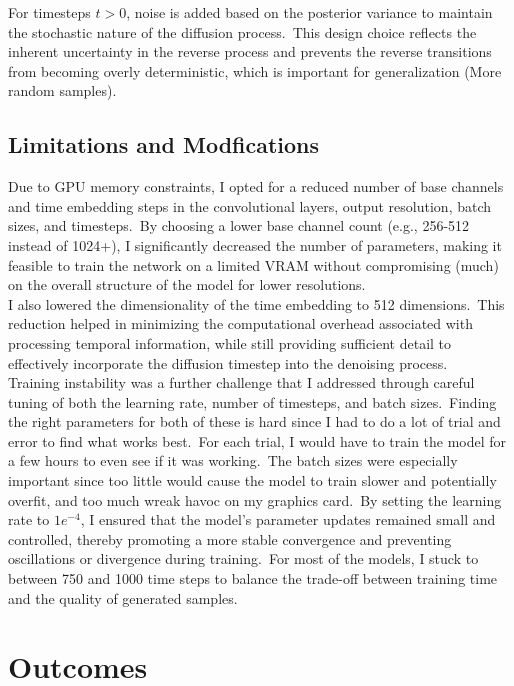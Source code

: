 \documentclass[12pt]{article}
\begin{document}
For timesteps $t > 0$, noise is added based on the posterior variance to maintain the stochastic nature of the diffusion process.\
This design choice reflects the inherent uncertainty in the reverse process and prevents the reverse transitions from becoming overly deterministic, which is important for generalization (More random samples).

\subsection{Limitations and Modfications}
Due to GPU memory constraints, I opted for a reduced number of base channels and time embedding steps in the convolutional layers, output resolution, batch sizes, and timesteps.\
By choosing a lower base channel count (e.g., 256-512 instead of 1024+), I significantly decreased the number of parameters, making it feasible to train the network on a limited VRAM without compromising (much) on the overall structure of the model for lower resolutions.\\
I also lowered the dimensionality of the time embedding to 512 dimensions.\
This reduction helped in minimizing the computational overhead associated with processing temporal information, while still providing sufficient detail to effectively incorporate the diffusion timestep into the denoising process.\\

Training instability was a further challenge that I addressed through careful tuning of both the learning rate, number of timesteps, and batch sizes.\
Finding the right parameters for both of these is hard since I had to do a lot of trial and error to find what works best.\
For each trial, I would have to train the model for a few hours to even see if it was working.\
The batch sizes were especially important since too little would cause the model to train slower and potentially overfit, and too much wreak havoc on my graphics card.\
By setting the learning rate to \(1e^{-4}\), I ensured that the model’s parameter updates remained small and controlled, thereby promoting a more stable convergence and preventing oscillations or divergence during training.\
For most of the models, I stuck to between 750 and 1000 time steps to balance the trade-off between training time and the quality of generated samples.

\pagebreak
\section{Outcomes}
\end{document}
